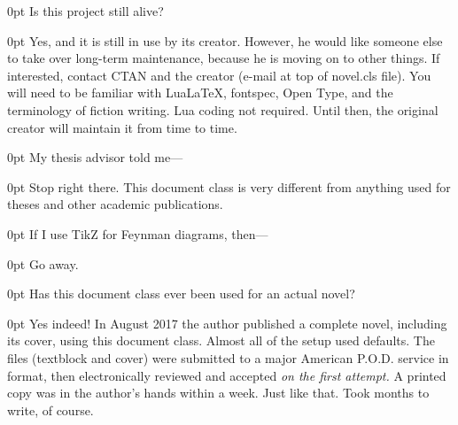 \documentclass{novel} %
\begin{document}
\begin{adjustwidth}{\parindent}{0pt}
\backindent{}Is this project still alive?
\end{adjustwidth}
\begin{adjustwidth}{\parindent}{0pt}
\backindent{}Yes, and it is still in use by its creator. However, he would like someone else to take over long-term maintenance, because he is moving on to other things. If interested, contact CTAN and the creator (e-mail at top of novel.cls file). You will need to be familiar with LuaLaTeX, fontspec, Open Type, and the terminology of fiction writing. Lua coding not required. Until then, the original creator will maintain it from time to time.
\end{adjustwidth}

\begin{adjustwidth}{\parindent}{0pt}
\backindent{}My thesis advisor told me---
\end{adjustwidth}
\begin{adjustwidth}{\parindent}{0pt}
\backindent{}Stop right there. This document class is very different from anything used for theses and other academic publications.
\end{adjustwidth}

\begin{adjustwidth}{\parindent}{0pt}
\backindent{}If I use TikZ for Feynman diagrams, then---
\end{adjustwidth}
\begin{adjustwidth}{\parindent}{0pt}
\backindent{}Go away.
\end{adjustwidth}

\begin{adjustwidth}{\parindent}{0pt}
\backindent{}Has this document class ever been used for an actual novel?
\end{adjustwidth}
\begin{adjustwidth}{\parindent}{0pt}
\backindent{}Yes indeed! In August 2017 the author published a complete novel, including its cover, using this document class. Almost all of the setup used defaults. The files (textblock and cover) were submitted to a major American P.O.D. service in  format, then electronically reviewed and accepted \textit{on the first attempt.} A printed copy was in the author's hands within a week. Just like that. Took months to write, of course.
\end{adjustwidth}
\end{document}
